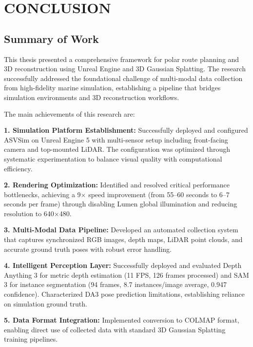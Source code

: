 \clearpage
\section{CONCLUSION}

\subsection{Summary of Work}

This thesis presented a comprehensive framework for polar route planning and 3D reconstruction using Unreal Engine and 3D Gaussian Splatting. The research successfully addressed the foundational challenge of multi-modal data collection from high-fidelity marine simulation, establishing a pipeline that bridges simulation environments and 3D reconstruction workflows.

The main achievements of this research are:

\textbf{1. Simulation Platform Establishment:} Successfully deployed and configured ASVSim on Unreal Engine 5 with multi-sensor setup including front-facing camera and top-mounted LiDAR. The configuration was optimized through systematic experimentation to balance visual quality with computational efficiency.

\textbf{2. Rendering Optimization:} Identified and resolved critical performance bottlenecks, achieving a 9$\times$ speed improvement (from 55--60 seconds to 6--7 seconds per frame) through disabling Lumen global illumination and reducing resolution to 640$\times$480.

\textbf{3. Multi-Modal Data Pipeline:} Developed an automated collection system that captures synchronized RGB images, depth maps, LiDAR point clouds, and accurate ground truth poses with robust error handling.

\textbf{4. Intelligent Perception Layer:} Successfully deployed and evaluated Depth Anything 3 for metric depth estimation (11 FPS, 126 frames processed) and SAM 3 for instance segmentation (94 frames, 8.7 instances/image average, 0.947 confidence). Characterized DA3 pose prediction limitations, establishing reliance on simulation ground truth.

\textbf{5. Data Format Integration:} Implemented conversion to COLMAP format, enabling direct use of collected data with standard 3D Gaussian Splatting training pipelines.

